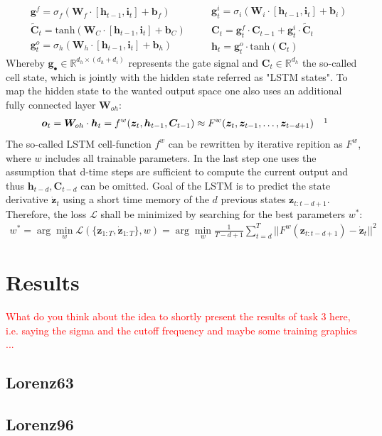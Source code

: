 \documentclass{scrarticle}
\begin{document}
	\begin{equation}
	\begin{aligned}
		&\bm{g}^f = \sigma_f(\bm{W}_f\cdot[\bm{h}_{t-1}, \bm{i}_t]+\bm{b}_f)\\
		&\tilde{\bm{C}}_t = \text{tanh}(\bm{W}_C\cdot[\bm{h}_{t-1}, \bm{i}_t]+\bm{b}_C)\\
		&\bm{g}_t^o=\sigma_h(\bm{W}_h\cdot[\bm{h}_{t-1}, \bm{i}_t]+\bm{b}_h)
	\end{aligned}
	\quad
	\begin{aligned}
		&\bm{g}_t^i=\sigma_i(\bm{W}_i\cdot[\bm{h}_{t-1}, \bm{i}_t]+\bm{b}_i)\\
		&\bm{C}_t = \bm{g}_t^f\cdot\bm{C}_{t-1} +\bm{g}_t^i\cdot\tilde{\bm{C}}_t\\
		&\bm{h}_t = \bm{g}_t^o\cdot\text{tanh}(\bm{C}_t)
	\end{aligned}
	\end{equation}
	Whereby $\bm{g}_\bullet\in\mathbb{R}^{d_h\times(d_h+d_i)}$ represents the gate signal and $\bm{C}_t\in\mathbb{R}^{d_h}$ the so-called cell state, which is jointly with the hidden state referred as "LSTM states". To map the hidden state to the wanted output space one also uses an additional fully connected layer $\bm{W}_{oh}$:
	\begin{align}
		\bm{o}_t = \bm{W}_{oh}\cdot\bm{h}_t = f^w(\bm{z}_t, \bm{h}_{t-1}, \bm{C}_{t-1}) \approx F^w(\bm{z}_t, \bm{z}_{t-1}, \hdots, \bm{z}_{t-d+1}) \quad\footnotemark
	\end{align}
	The so-called LSTM cell-function $f^w$ can be rewritten by iterative repition as $F^w$, where $w$ includes all trainable parameters. In the last step one uses the assumption that d-time steps are sufficient to compute the current output and thus $\bm{h}_{t-d},\bm{C}_{t-d}$ can be omitted.
	Goal of the LSTM is to predict the state derivative $\bm{\dot{z}}_t$ using a short time memory of the $d$ previous states $\bm{z}_{t:t-d+1}$. Therefore, the loss $\mathcal{L}$ shall be minimized by searching for the best parameters $w^*$:
	\begin{align}
	w^* = \arg\min_w\mathcal{L}(\{\bm{z}_{1:T},\bm{\dot{z}}_{1:T}\},w)=\arg\min_w\frac{1}{T-d+1}\sum_{t=d}^T||F^w(\bm{z}_{t:t-d+1})-\bm{\dot{z}}_t||^2
	\end{align}
	
	\section{Results}
	\textcolor{red}{What do you think about the idea to shortly present the results of task 3 here, i.e. saying the sigma and the cutoff frequency and maybe some training graphics ...}
	\subsection{Lorenz63}
	\subsection{Lorenz96}
	
	\printbibliography
\end{document}
